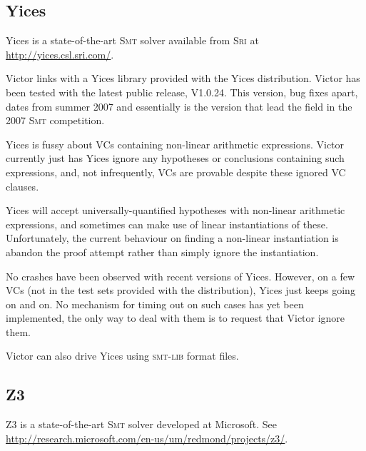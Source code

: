 \documentclass[12pt,fleqn]{article}
\newcommand{\zthree}{\textsc{Z}3}
\newcommand{\yices}{Yices}
\newcommand{\smt}{\textsc{Smt}}
\newcommand{\sri}{\textsc{Sri}}
\newcommand{\smtlib}{\textsc{smt-lib}}
\begin{document}
\subsection{Yices}

\yices{} is a state-of-the-art \smt{} solver available from \sri{} at
\url{http://yices.csl.sri.com/}.

Victor links with a \yices{} library provided with the \yices{}
distribution.  Victor has been tested with the latest public release,
V1.0.24.  This version, bug fixes apart, dates from summer 2007 and
essentially is the version that lead the field in the 2007 \smt{}
competition. 


\yices{} is fussy about VCs containing non-linear arithmetic
expressions.  Victor currently just has \yices{} ignore any hypotheses
or conclusions containing such expressions, and, not infrequently, VCs
are provable despite these ignored VC clauses.  
%

\yices{} will accept universally-quantified hypotheses with non-linear
arithmetic expressions, and sometimes can make use of linear
instantiations of these.
%
Unfortunately, the current behaviour on finding a non-linear
instantiation is abandon the proof attempt rather than simply ignore
the instantiation.  

No crashes have been observed with recent versions of \yices.
However, on a few VCs (not in the test sets provided with the
distribution), \yices{} just keeps going on and on.  No mechanism for
timing out on such cases has yet been implemented, the only way to
deal with them is to request that Victor ignore them.

Victor can also drive Yices using \smtlib{} format files. 

\subsection{Z3}

\zthree{} is a state-of-the-art \smt{} solver developed at Microsoft. See
\url{http://research.microsoft.com/en-us/um/redmond/projects/z3/}.
\end{document}
